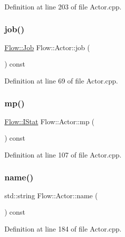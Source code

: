 Definition at line 203 of file Actor.\+cpp.

\hypertarget{class_flow_1_1_actor_aac6046fc99b742a2307084b0b366c2ed}{}\label{class_flow_1_1_actor_aac6046fc99b742a2307084b0b366c2ed} 
\subsubsection{\texorpdfstring{job()}{job()}}
{\footnotesize\ttfamily \hyperlink{namespace_flow_a05bb774db920847e46f3779aaef1b07b}{Flow\+::\+Job} Flow\+::\+Actor\+::job (\begin{DoxyParamCaption}{ }\end{DoxyParamCaption}) const}



Definition at line 69 of file Actor.\+cpp.

\hypertarget{class_flow_1_1_actor_a197cf5bc7b1b24c4e557adbdc6d9bbdf}{}\label{class_flow_1_1_actor_a197cf5bc7b1b24c4e557adbdc6d9bbdf} 
\subsubsection{\texorpdfstring{mp()}{mp()}}
{\footnotesize\ttfamily \hyperlink{class_flow_1_1_i_stat}{Flow\+::\+I\+Stat} Flow\+::\+Actor\+::mp (\begin{DoxyParamCaption}{ }\end{DoxyParamCaption}) const}



Definition at line 107 of file Actor.\+cpp.

\hypertarget{class_flow_1_1_actor_a66f88663ad38508b09e53115608dd0f7}{}\label{class_flow_1_1_actor_a66f88663ad38508b09e53115608dd0f7} 
\subsubsection{\texorpdfstring{name()}{name()}}
{\footnotesize\ttfamily std\+::string Flow\+::\+Actor\+::name (\begin{DoxyParamCaption}{ }\end{DoxyParamCaption}) const}



Definition at line 184 of file Actor.\+cpp.

